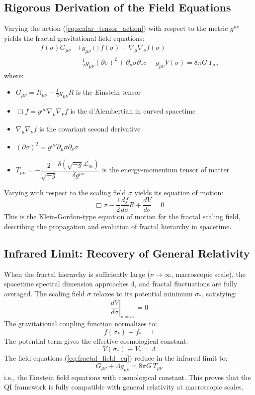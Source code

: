 \documentclass[12pt,a4paper,twocolumn]{article}
\begin{document}
\subsection{Rigorous Derivation of the Field Equations}
Varying the action (\ref{eq:scalar_tensor_action}) with respect to the metric $g^{\mu\nu}$ yields the fractal gravitational field equations:
\[
\boxed{
\begin{aligned}
f(\sigma) G_{\mu\nu} &+ g_{\mu\nu} \Box f(\sigma) - \nabla_\mu \nabla_\nu f(\sigma) \\
&- \frac{1}{2} g_{\mu\nu} (\partial\sigma)^2 + \partial_\mu\sigma \partial_\nu\sigma - g_{\mu\nu} V(\sigma) = 8\pi G \, T_{\mu\nu}
\end{aligned}
}
\label{eq:fractal_field_eq}
\]
where:
\begin{itemize}
\item $G_{\mu\nu} = R_{\mu\nu} - \frac{1}{2}g_{\mu\nu}R$ is the Einstein tensor
\item $\Box f = g^{\mu\nu}\nabla_\mu\nabla_\nu f$ is the d'Alembertian in curved spacetime
\item $\nabla_\mu \nabla_\nu f$ is the covariant second derivative
\item $(\partial\sigma)^2 = g^{\mu\nu}\partial_\mu\sigma \partial_\nu\sigma$
\item $T_{\mu\nu} = -\dfrac{2}{\sqrt{-g}}\dfrac{\delta(\sqrt{-g}\mathcal{L}_m)}{\delta g^{\mu\nu}}$ is the energy-momentum tensor of matter
\end{itemize}

Varying with respect to the scaling field $\sigma$ yields its equation of motion:
\[
\boxed{
\Box \sigma - \frac{1}{2}\frac{df}{d\sigma} R + \frac{dV}{d\sigma} = 0
}
\label{eq:sigma_eq}
\]
This is the Klein-Gordon-type equation of motion for the fractal scaling field, describing the propagation and evolution of fractal hierarchy in spacetime.

\subsection{Infrared Limit: Recovery of General Relativity}
When the fractal hierarchy is sufficiently large ($\nu \to \infty$, macroscopic scale), the spacetime spectral dimension approaches 4, and fractal fluctuations are fully averaged. The scaling field $\sigma$ relaxes to its potential minimum $\sigma_*$, satisfying:
\begin{equation}
\left.\frac{dV}{d\sigma}\right|_{\sigma=\sigma_*} = 0
\end{equation}
The gravitational coupling function normalizes to:
\begin{equation}
f(\sigma_*) \equiv f_* = 1
\end{equation}
The potential term gives the effective cosmological constant:
\begin{equation}
V(\sigma_*) \equiv V_* = \Lambda
\end{equation}
The field equations (\ref{eq:fractal_field_eq}) reduce in the infrared limit to:
\[
\boxed{
G_{\mu\nu} + \Lambda g_{\mu\nu} = 8\pi G \, T_{\mu\nu}
}
\label{eq:GR_limit}
\]
i.e., the Einstein field equations with cosmological constant. This proves that the QI framework is fully compatible with general relativity at macroscopic scales.
\end{document}
